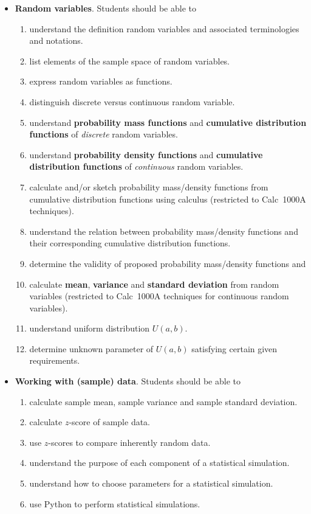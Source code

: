 \documentclass[../main.tex]{subfiles}
\begin{document}
\begin{itemize}
  \item \textbf{Random variables}. Students should be able to 
    \begin{enumerate}
      \item understand the definition random variables and associated terminologies and notations.
      \item list elements of the sample space of random variables.
      \item express random variables as functions.
      \item distinguish discrete versus continuous random variable.
      \item understand \textbf{probability mass functions} and \textbf{cumulative distribution functions} of \emph{discrete} random variables.
      \item understand \textbf{probability density functions} and \textbf{cumulative distribution functions} of \emph{continuous} random variables.
      \item calculate and/or sketch probability mass/density functions from cumulative distribution functions using calculus (restricted to Calc~1000A techniques).
      \item understand the relation between probability mass/density functions and their corresponding cumulative distribution functions.
      \item determine the validity of proposed probability mass/density functions and 
      \item calculate \textbf{mean}, \textbf{variance} and \textbf{standard deviation} from random variables (restricted to Calc~1000A techniques for continuous random variables).
       \item understand uniform distribution \(U(a,b)\).
       \item determine unknown parameter of \(U(a,b)\) satisfying certain given requirements.
    \end{enumerate}
    
  \item \textbf{Working with (sample) data}. Students should be able to
     \begin{enumerate}
       \item calculate sample mean, sample variance and sample standard deviation.
       \item calculate \(z\)-score of sample data.
       \item use \(z\)-scores to compare inherently random data.
       \item understand the purpose of each component of a statistical simulation.
       \item understand how to choose parameters for a statistical simulation.
       \item use Python to perform statistical simulations.
     \end{enumerate}


\end{itemize}
\end{document}
